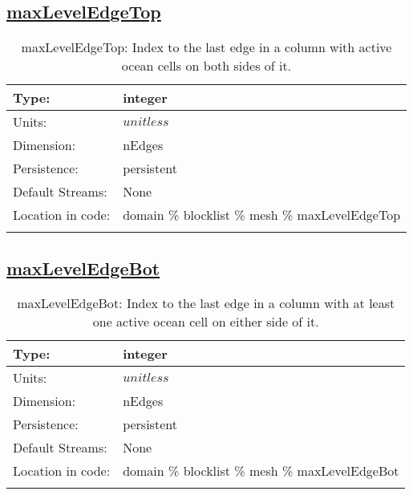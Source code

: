 \subsection[maxLevelEdgeTop]{\hyperref[sec:var_tab_mesh]{maxLevelEdgeTop}}
\label{subsec:var_sec_mesh_maxLevelEdgeTop}
\begin{center}
\begin{longtable}{| p{2.0in} | p{4.0in} |}
        \hline 
        Type: & integer \\
        \hline 
        Units: & $unitless$ \\
        \hline 
        Dimension: & nEdges \\
        \hline 
        Persistence: & persistent \\
        \hline 
		 Default Streams: & None \\
        \hline 
		 Location in code: & domain \% blocklist \% mesh \% maxLevelEdgeTop \\
		 \hline 
    \caption{maxLevelEdgeTop: Index to the last edge in a column with active ocean cells on both sides of it.}
\end{longtable}
\end{center}
\subsection[maxLevelEdgeBot]{\hyperref[sec:var_tab_mesh]{maxLevelEdgeBot}}
\label{subsec:var_sec_mesh_maxLevelEdgeBot}
\begin{center}
\begin{longtable}{| p{2.0in} | p{4.0in} |}
        \hline 
        Type: & integer \\
        \hline 
        Units: & $unitless$ \\
        \hline 
        Dimension: & nEdges \\
        \hline 
        Persistence: & persistent \\
        \hline 
		 Default Streams: & None \\
        \hline 
		 Location in code: & domain \% blocklist \% mesh \% maxLevelEdgeBot \\
		 \hline 
    \caption{maxLevelEdgeBot: Index to the last edge in a column with at least one active ocean cell on either side of it.}
\end{longtable}
\end{center}
